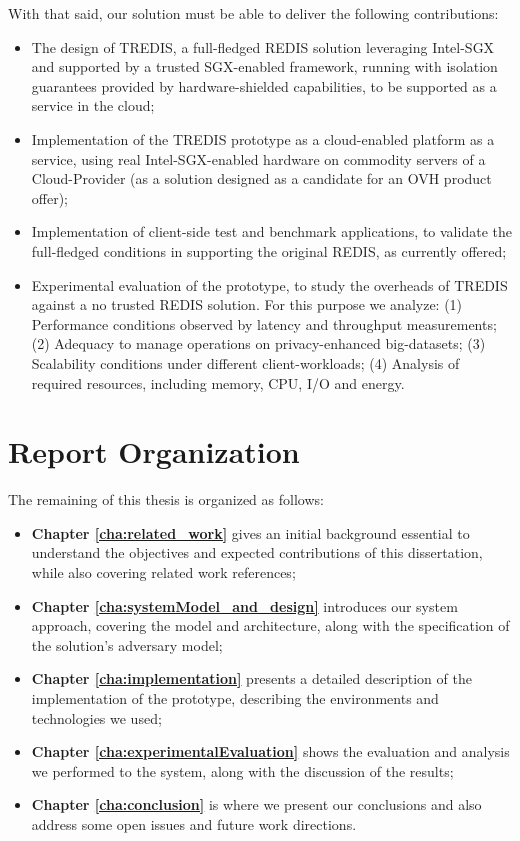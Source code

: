 With that said, our solution must be able to deliver the following contributions:
\begin{itemize}
	\item The design of TREDIS, a full-fledged REDIS solution leveraging Intel-SGX and supported by a trusted SGX-enabled framework, running with isolation guarantees provided by hardware-shielded capabilities, to be supported as a service in the cloud;
	\item Implementation of the TREDIS prototype as a cloud-enabled platform as a service, using real Intel-SGX-enabled hardware on commodity servers of a Cloud-Provider (as a solution designed as a candidate for an OVH product offer);
	\item Implementation of client-side test and benchmark applications, to validate the full-fledged conditions in supporting the original REDIS, as currently offered;
	\item Experimental evaluation of the prototype, to study the overheads of TREDIS against a no trusted REDIS solution. For this purpose we analyze: (1) Performance conditions observed by latency and throughput measurements; (2) Adequacy to manage operations on privacy-enhanced big-datasets; (3) Scalability conditions under different client-workloads; (4) Analysis of required resources, including memory, CPU, I/O and energy.
	
\end{itemize}




\section{Report Organization}

The remaining of this thesis is organized as follows:
\begin{itemize}
	\item \textbf{Chapter \ref{cha:related_work}} gives an initial background essential to understand the objectives and expected contributions of this dissertation, while also covering related work references; 
	
	\item \textbf{Chapter \ref{cha:systemModel_and_design}} introduces our system approach, covering the model and architecture, along with the specification of the solution's adversary model;

	\item \textbf{Chapter \ref{cha:implementation}} presents a detailed description of the implementation of the prototype, describing the environments and technologies we used;
	
	\item \textbf{Chapter \ref{cha:experimentalEvaluation}} shows the evaluation and analysis we performed to the system, along with the discussion of the results;
	
	\item \textbf{Chapter \ref{cha:conclusion}} is where we present our conclusions and also address some open issues and future work directions.
	
\end{itemize}
